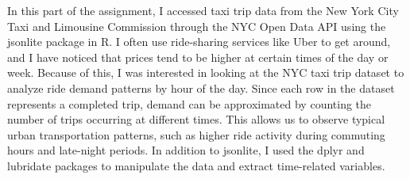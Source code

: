 \documentclass{article}
\begin{document}
In this part of the assignment, I accessed taxi trip data from the New York City Taxi and Limousine Commission through the NYC Open Data API using the jsonlite package in R. I often use ride-sharing services like Uber to get around, and I have noticed that prices tend to be higher at certain times of the day or week. Because of this, I was interested in looking at the NYC taxi trip dataset to analyze ride demand patterns by hour of the day. Since each row in the dataset represents a completed trip, demand can be approximated by counting the number of trips occurring at different times. This allows us to observe typical urban transportation patterns, such as higher ride activity during commuting hours and late-night periods. In addition to jsonlite, I used the dplyr and lubridate packages to manipulate the data and extract time-related variables.
\end{document}
